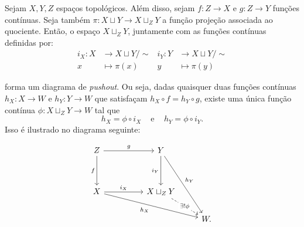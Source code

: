 \begin{prop}
    Sejam $X,Y,Z$ espaços topológicos. Além disso, sejam $f:Z\rightarrow X$ e $g:Z\rightarrow Y$ funções contínuas. Seja também $\pi:X\sqcup Y\rightarrow X\sqcup_Z Y$ a função projeção associada ao quociente. Então, o espaço $X\sqcup_Z Y$, juntamente com as funções contínuas definidas por:
    \begin{align*}
        i_X:X &\longrightarrow X\sqcup Y/\sim & i_Y:Y&\longrightarrow X\sqcup Y/\sim\\
        x&\longmapsto \pi(x) & y &\longmapsto \pi(y)
    \end{align*}
    
    forma um diagrama de \emph{pushout}. Ou seja, dadas quaisquer duas funções contínuas $h_X:X\rightarrow W$ e $h_Y:Y\rightarrow W$ que satisfaçam $h_X\circ f=h_Y\circ g$, existe uma única função contínua 
    $\phi:X\sqcup_Z Y\rightarrow W$ tal que 
    $$h_X=\phi\circ i_X \;\;\;\text{ e }\;\;\; h_Y=\phi\circ i_Y.$$ 
    Isso é ilustrado no diagrama seguinte:

\[\begin{tikzcd}
	Z && Y \\
	\\
	X && {X\sqcup_Z Y} \\
	&&& W.
	\arrow["g", from=1-1, to=1-3]
	\arrow["f"', from=1-1, to=3-1]
	\arrow["{i_Y}"', from=1-3, to=3-3]
	\arrow["{h_Y}", from=1-3, to=4-4]
	\arrow["{i_X}", from=3-1, to=3-3]
	\arrow["{h_X}"', from=3-1, to=4-4]
	\arrow["{\exists! \phi}"{description}, dashed, from=3-3, to=4-4]
\end{tikzcd}\]
\end{prop}

